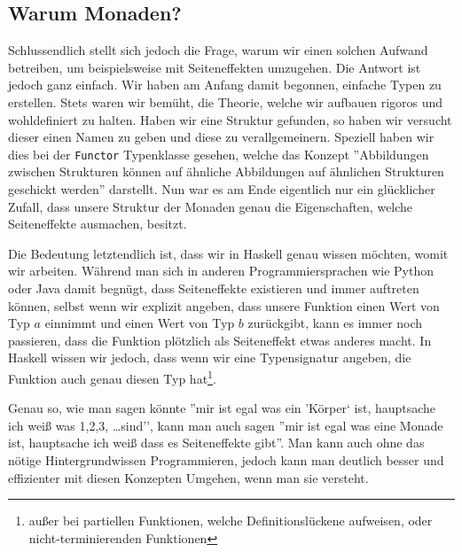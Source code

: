 \documentclass{hhuarticle}
\theoremstyle{definition}
\theoremstyle{theorem}
\begin{document}
  \subsection{Warum Monaden?}

  Schlussendlich stellt sich jedoch die Frage, warum wir einen solchen 
  Aufwand betreiben, um beispielsweise mit Seiteneffekten umzugehen.
  Die Antwort ist jedoch ganz einfach. Wir haben am Anfang damit begonnen,
  einfache Typen zu erstellen. Stets waren wir bemüht, die Theorie, welche
  wir aufbauen rigoros und wohldefiniert zu halten. Haben wir eine
  Struktur gefunden, so haben wir versucht dieser einen Namen zu geben und
  diese zu verallgemeinern. Speziell haben wir dies bei der \verb|Functor|
  Typenklasse gesehen, welche das Konzept ''Abbildungen zwischen Strukturen
  können auf ähnliche Abbildungen auf ähnlichen Strukturen geschickt werden''
  darstellt. Nun war es am Ende eigentlich nur ein glücklicher
  Zufall, dass unsere Struktur der Monaden genau die Eigenschaften,
  welche Seiteneffekte ausmachen, besitzt.

  Die Bedeutung letztendlich ist, dass wir in Haskell genau wissen möchten,
  womit wir arbeiten.
  Während man sich in anderen Programmiersprachen
  wie Python oder Java damit begnügt, dass Seiteneffekte existieren
  und immer auftreten können,
  selbst wenn wir explizit angeben,
  dass unsere Funktion einen Wert von Typ $a$ einnimmt und einen Wert
  von Typ $b$ zurückgibt,
  kann es immer noch passieren, dass die Funktion plötzlich als Seiteneffekt
  etwas anderes macht.
  In Haskell wissen wir jedoch, dass wenn
  wir eine Typensignatur angeben, die Funktion auch genau diesen Typ
  hat\footnote{außer bei partiellen Funktionen, welche Definitionslückene aufweisen, oder nicht-terminierenden Funktionen}.

  Genau so, wie man sagen könnte ''mir ist egal was ein 'Körper` ist,
  hauptsache ich weiß was 1,2,3, \dots sind'', kann man auch sagen
  ''mir ist egal was eine Monade ist, hauptsache ich weiß dass es
  Seiteneffekte gibt''. Man kann auch ohne das nötige Hintergrundwissen
  Programmieren, jedoch kann man deutlich besser und effizienter
  mit diesen Konzepten Umgehen, wenn man sie versteht.

\end{document}
